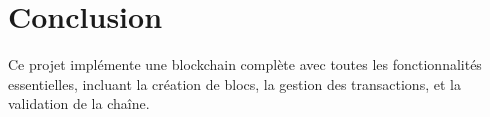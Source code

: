 \documentclass[french]{article}
\begin{document}

\section{Conclusion}
Ce projet implémente une blockchain complète avec toutes les fonctionnalités essentielles, incluant la création de blocs, la gestion des transactions, et la validation de la chaîne.
\end{document}
